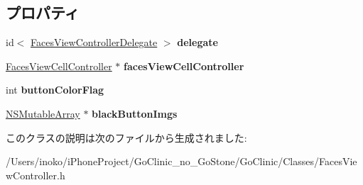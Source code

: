 \subsection*{プロパティ}
\begin{DoxyCompactItemize}
\item 
\hypertarget{interface_faces_view_controller_ab1fea4872bd265b9d0b81f66180c4efb}{
id$<$ \hyperlink{protocol_faces_view_controller_delegate-p}{FacesViewControllerDelegate} $>$ {\bfseries delegate}}
\label{interface_faces_view_controller_ab1fea4872bd265b9d0b81f66180c4efb}

\item 
\hypertarget{interface_faces_view_controller_acec47fda1ebf9bc0b55cfd1accec9b34}{
\hyperlink{interface_faces_view_cell_controller}{FacesViewCellController} $\ast$ {\bfseries facesViewCellController}}
\label{interface_faces_view_controller_acec47fda1ebf9bc0b55cfd1accec9b34}

\item 
\hypertarget{interface_faces_view_controller_a222a418be1973eba31c6211d8e0023e2}{
int {\bfseries buttonColorFlag}}
\label{interface_faces_view_controller_a222a418be1973eba31c6211d8e0023e2}

\item 
\hypertarget{interface_faces_view_controller_ac17c50276b2e991235326ae8ba8e4848}{
\hyperlink{class_n_s_mutable_array}{NSMutableArray} $\ast$ {\bfseries blackButtonImgs}}
\label{interface_faces_view_controller_ac17c50276b2e991235326ae8ba8e4848}

\end{DoxyCompactItemize}


このクラスの説明は次のファイルから生成されました:\begin{DoxyCompactItemize}
\item 
/Users/inoko/iPhoneProject/GoClinic\_\-no\_\-GoStone/GoClinic/Classes/FacesViewController.h\end{DoxyCompactItemize}
